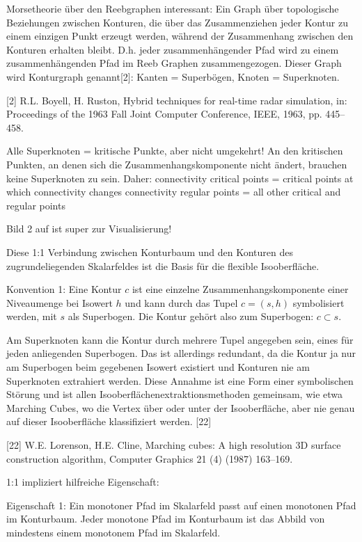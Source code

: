 Morsetheorie über den Reebgraphen interessant: Ein Graph über topologische Beziehungen zwischen Konturen, die über das Zusammenziehen jeder Kontur zu einem einzigen Punkt erzeugt werden, während der Zusammenhang zwischen den Konturen erhalten bleibt. D.h. jeder zusammenhängender Pfad wird zu einem zusammenhängenden Pfad im Reeb Graphen zusammengezogen. Dieser Graph wird Konturgraph genannt[2]: Kanten = Superbögen, Knoten = Superknoten.

[2] R.L. Boyell, H. Ruston, Hybrid techniques for real-time radar simulation, in: Proceedings of the 1963 Fall Joint Computer Conference, IEEE, 1963,
pp. 445–458.

Alle Superknoten = kritische Punkte, aber nicht umgekehrt! An den kritischen Punkten, an denen sich die Zusammenhangskomponente nicht ändert, brauchen keine Superknoten zu sein. Daher:
connectivity critical points = critical points at which connectivity changes
connectivity regular points = all other critical and regular points

Bild 2 auf \cite[S.~44]{carr2010flexibleIsosurfaces} ist super zur Visualisierung!

Diese 1:1 Verbindung zwischen Konturbaum und den Konturen des zugrundeliegenden Skalarfeldes ist die Basis für die flexible Isooberfläche.

Konvention 1: Eine Kontur $c$ ist eine einzelne Zusammenhangskomponente einer Niveaumenge bei Isowert $h$ und kann durch das Tupel $c = (s,h)$ symbolisiert werden, mit $s$ als Superbogen. Die Kontur gehört also zum Superbogen: $c \subset s$.

Am Superknoten kann die Kontur durch mehrere Tupel angegeben sein, eines für jeden anliegenden Superbogen. Das ist allerdings redundant, da die Kontur ja nur am Superbogen beim gegebenen Isowert existiert und Konturen nie am Superknoten extrahiert werden. Diese Annahme ist eine Form einer symbolischen Störung und ist allen Isooberflächenextraktionsmethoden gemeinsam, wie etwa Marching Cubes, wo die Vertex über oder unter der Isooberfläche, aber nie genau auf dieser Isooberfläche klassifiziert werden. [22]

[22] W.E. Lorenson, H.E. Cline, Marching cubes: A high resolution 3D surface construction algorithm, Computer Graphics 21 (4) (1987) 163–169.

1:1 impliziert hilfreiche Eigenschaft:

Eigenschaft 1: Ein monotoner Pfad im Skalarfeld passt auf einen monotonen Pfad im Konturbaum. Jeder monotone Pfad im Konturbaum ist das Abbild von mindestens einem monotonem Pfad im Skalarfeld.

